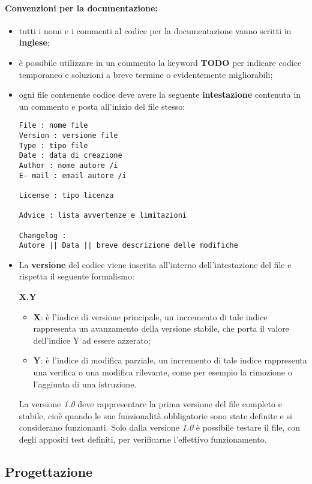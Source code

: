 \documentclass[NormeDiProgetto.tex]{subfiles}
\begin{document}
\paragraph*{Convenzioni per la documentazione: }
\begin{itemize}
	\item tutti i nomi e i commenti al codice per la documentazione vanno scritti in \textbf{inglese};
	\item è possibile utilizzare in un commento la keyword \textbf{TODO} per indicare codice temporaneo e soluzioni a breve termine o evidentemente migliorabili;
	\item ogni file contenente codice deve avere la seguente \textbf{intestazione} contenuta in un commento e posta all'inizio del file stesso:
\begin{center}{
\begin{minipage}{12cm}
\begin{Verbatim}[frame=single]
File : nome file
Version : versione file
Type : tipo file
Date : data di creazione
Author : nome autore /i
E- mail : email autore /i

License : tipo licenza

Advice : lista avvertenze e limitazioni

Changelog :
Autore || Data || breve descrizione delle modifiche
\end{Verbatim}
\end{minipage}
}
\end{center}
	\item La \textbf{versione} del codice viene inserita all’interno dell’intestazione del file e rispetta il
	seguente formalismo:
	\begin{center}{\textbf{X.Y}}\end{center}	
	\begin{itemize}
		\item \textbf{X}: è l’indice di versione principale, un incremento di tale indice rappresenta un avanzamento della versione stabile, che porta il valore dell’indice Y ad essere azzerato;
		\item \textbf{Y}: è l’indice di modifica parziale, un incremento di tale indice rappresenta una verifica o una modifica rilevante, come per esempio la rimozione o l’aggiunta di una istruzione.
	\end{itemize}
	La versione \textit{1.0} deve rappresentare la prima versione del file completo e stabile, cioè quando le sue funzionalità obbligatorie sono state definite e si considerano funzionanti. Solo dalla versione \textit{1.0} è possibile testare il file, con degli appositi test definiti, per	verificarne l’effettivo funzionamento.
\end{itemize}







\subsection{Progettazione}
\end{document}
